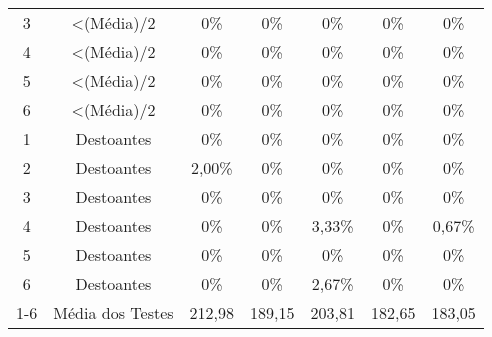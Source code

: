 \begin{table}[]
\begin{tabular}{|c|c|ccccc|}
3                         & \textless (Média)/2                                                        & 0\%                     & 0\%                     & 0\%                     & 0\%                     & 0\%                      \\
4                         & \textless (Média)/2                                                        & 0\%                     & 0\%                     & 0\%                     & 0\%                     & 0\%                      \\
5                         & \textless (Média)/2                                                        & 0\%                     & 0\%                     & 0\%                     & 0\%                     & 0\%                      \\
6                         & \textless (Média)/2                                                        & 0\%                     & 0\%                     & 0\%                     & 0\%                     & 0\%                      \\ \hline
1                         & Destoantes                                                                 & 0\%                     & 0\%                     & 0\%                     & 0\%                     & 0\%                      \\
2                         & Destoantes                                                                 & 2,00\%                     & 0\%                     & 0\%                     & 0\%                     & 0\%                      \\
3                         & Destoantes                                                                 & 0\%                     & 0\%                     & 0\%                     & 0\%                     & 0\%                      \\
4                         & Destoantes                                                                 & 0\%                     & 0\%                     & 3,33\%                     & 0\%                     & 0,67\%                      \\
5                         & Destoantes                                                                 & 0\%                     & 0\%                     & 0\%                     & 0\%                     & 0\%                      \\
6                         & Destoantes                                                                 & 0\%                     & 0\%                     & 2,67\%                     & 0\%                     & 0\%                      \\ \hline
1-6 & Média dos Testes                                                           & 212,98 & 189,15 & 203,81 & 182,65 & 183,05 \\  \hline


\end{tabular}
\end{table}
